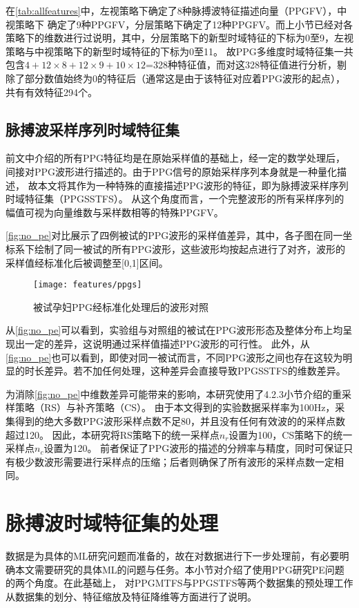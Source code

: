 在\autoref{tab:allfeatures}中，左视策略下确定了8种脉搏波特征描述向量（PPGFV），中视策略下
确定了9种PPGFV，分层策略下确定了12种PPGFV。而上小节已经对各策略下的维数进行过说明，其中，分层策略下的新型时域特征的下标为0至9，左视策略与中视策略下的新型时域特征的下标为0至11。
故PPG多维度时域特征集一共包含$4+12 \times 8+ 12 \times 9 + 10 \times 12$=328种特征值，而对这328特征值进行分析，剔除了部分数值始终为0的特征后（通常这是由于该特征对应着PPG波形的起点），
共有有效特征294个。

\subsection{脉搏波采样序列时域特征集}

前文中介绍的所有PPG特征均是在原始采样值的基础上，经一定的数学处理后，间接对PPG波形进行描述的。由于PPG信号的原始采样序列本身就是一种量化描述，
故本文将其作为一种特殊的直接描述PPG波形的特征，即为脉搏波采样序列时域特征集（PPGSSTFS）。
从这个角度而言，一个完整波形的所有采样序列的幅值可视为向量维数与采样数相等的特殊PPGFV。

\autoref{fig:no_pe}对比展示了四例被试的PPG波形的采样值差异，其中，各子图在同一坐标系下绘制了同一被试的所有PPG波形，这些波形均按起点进行了对齐，波形的采样值经标准化后被调整至[0,1]区间。

\begin{figure}[htbp]
  \centering
  \texttt{[image: features/ppgs]}
  \caption{\label{fig:no_pe}被试孕妇PPG经标准化处理后的波形对照}
\end{figure}

从\autoref{fig:no_pe}可以看到，实验组与对照组的被试在PPG波形形态及整体分布上均呈现出一定的差异，这说明通过采样值描述PPG波形的可行性。
此外，从\autoref{fig:no_pe}也可以看到，即使对同一被试而言，不同PPG波形之间也存在这较为明显的时长差异。若不加任何处理，这种差异会直接导致PPGSSTFS的维数差异。

为消除\autoref{fig:no_pe}中维数差异可能带来的影响，本研究使用了4.2.3小节介绍的重采样策略（RS）与补齐策略（CS）。
由于本文得到的实验数据采样率为100Hz，采集得到的绝大多数PPG波形采样点数不足80，并且没有任何有效波的的采样点数超过120。
因此，本研究将RS策略下的统一采样点$n_r$设置为100，CS策略下的统一采样点$n_c$设置为120。
前者保证了PPG波形的描述的分辨率与精度，同时可保证只有极少数波形需要进行采样点的压缩；后者则确保了所有波形的采样点数一定相同。

\section{脉搏波时域特征集的处理}
数据是为具体的ML研究问题而准备的，故在对数据进行下一步处理前，有必要明确本文需要研究的具体ML的问题与任务。本小节对介绍了使用PPG研究PE问题的两个角度。在此基础上，
对PPGMTFS与PPGSTFS等两个数据集的预处理工作从数据集的划分、特征缩放及特征降维等方面进行了说明。


